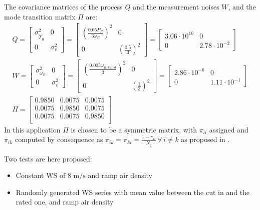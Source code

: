The covariance matrices of the process $Q$ and the measurement noises $W$, and the mode transition matrix $\Pi$ are:
\begin{gather}
  Q = \begin{bmatrix}
    \sigma_{\tilde{T}_R}^2 & 0 \\
    0 & \sigma_v^2
  \end{bmatrix} =
  \begin{bmatrix}
    \left(\frac{0.05 P_R}{3\omega_R}\right)^2 & 0 \\
    0 & \left(\frac{0.5}{3}\right)^2
  \end{bmatrix} =
  \begin{bmatrix}
    3.06\cdot10^{10} & 0 \\
    0 & 2.78\cdot10^{-2}
  \end{bmatrix} \\
  W = \begin{bmatrix}
    \sigma_{\omega_R}^2 & 0 \\
    0 & \sigma_{v}^2
  \end{bmatrix} =
  \begin{bmatrix}
    \left(\frac{0.005 \omega_{R,rated}}{3}\right)^2 & 0 \\
    0 & \left(\frac{1}{3}\right)^2
  \end{bmatrix} =
  \begin{bmatrix}
    2.86\cdot10^{-6} & 0 \\
    0 & 1.11\cdot10^{-1}
  \end{bmatrix} \\
  \Pi=
  \begin{bmatrix}
    0.9850  &  0.0075  &  0.0075\\
    0.0075  &  0.9850  &  0.0075\\
    0.0075  &  0.0075  &  0.9850\\
  \end{bmatrix}
\end{gather}
In this application $\Pi$ is chosen to be a symmetric matrix, with $\pi_{ii}$ assigned and $\pi_{ik}$ computed by consequence as $\pi_{ik}=\pi_{ki}=\frac{1 - \pi_{ii}}{N_j} \,\forall \, i\neq k $ as proposed in \cite{kalman_based_IMM}.

Two tests are here proposed:
\begin{itemize}
  \item Constant WS of 8 $\si{\meter\per\second}$ and ramp air density  
  \item Randomly generated WS series with mean value between the cut in and the rated one, and ramp air density
\end{itemize}

